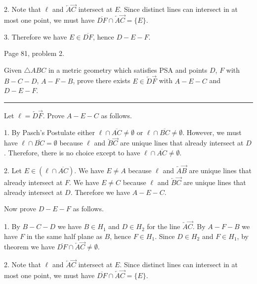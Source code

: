 \medskip
\item{2.} Note that $\ell$ and $\overleftarrow A\overrightarrow C$ intersect at $E$.
Since distinct lines can intersect in at most one point, we must have
$\overline{DF}\cap\overleftarrow A\overrightarrow C=\{E\}$.

\medskip
\item{3.} Therefore we have $E\in\overline{DF}$, hence $D{-}E{-}F$.







\vfill
\eject

\beginsection Page 81, problem 2.

Given $\triangle ABC$ in a metric geometry which satisfies PSA and points
$D$, $F$ with $B{-}C{-}D$, $A{-}F{-}B$, prove there exists
$E\in\overleftarrow D\overrightarrow F$ with $A{-}E{-}C$ and $D{-}E{-}F$.

\medskip\hrule

\bigskip\noindent
Let $\ell=\overleftarrow D\overrightarrow F$. Prove $A{-}E{-}C$ as follows.

\medskip
\item{1.} By Pasch's Postulate either $\ell\cap\overline{AC}\ne\emptyset$ or
$\ell\cap\overline{BC}\ne\emptyset$.
However, we must have $\ell\cap\overline{BC}=\emptyset$ because $\ell$ and
$\overleftarrow B\overrightarrow C$ are unique lines that already
intersect at $D$.
Therefore, there is no choice except to have $\ell\cap\overline{AC}\ne\emptyset$.

\medskip
\item{2.}
Let $E\in(\ell\cap\overline{AC})$.
%
We have $E\ne A$ because $\ell$ and
$\overleftarrow A\overrightarrow B$
are unique lines that already intersect at $F$.
%
We have $E\ne C$ because $\ell$ and
$\overleftarrow B\overrightarrow C$
are unique lines that already intersect at $D$.
%
Therefore we have $A{-}E{-}C$.

\medskip\noindent
Now prove $D{-}E{-}F$ as follows.
%
\medskip
\item{1.} By $B{-}C{-}D$ we have $B\in H_1$ and $D\in H_2$ for the line
$\overleftarrow A\overrightarrow C$.
%
By $A{-}F{-}B$ we have $F$ in the same half plane as $B$, hence $F\in H_1$.
%
Since $D\in H_2$ and $F\in H_1$, by theorem we have
$\overline{DF}\cap\overleftarrow A\overrightarrow C\ne\emptyset$.
%

\medskip
\item{2.} Note that $\ell$ and $\overleftarrow A\overrightarrow C$ intersect at $E$.
Since distinct lines can intersect in at most one point, we must have
$\overline{DF}\cap\overleftarrow A\overrightarrow C=\{E\}$.

